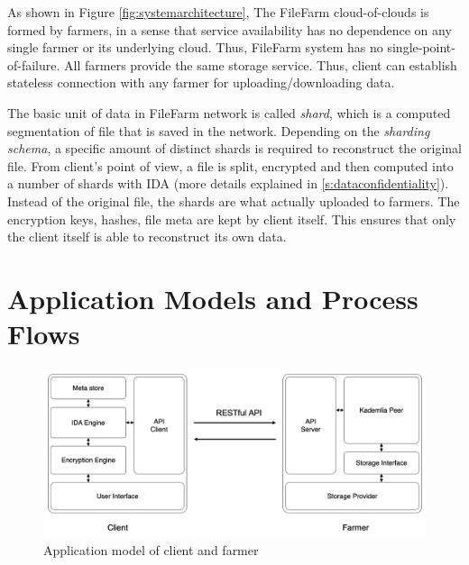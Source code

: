 As shown in Figure \ref{fig:systemarchitecture}, The FileFarm cloud-of-clouds is formed by farmers, in a sense that service availability has no dependence on any single farmer or its underlying cloud. Thus, FileFarm system has no single-point-of-failure. All farmers provide the same storage service. Thus, client can establish stateless connection with any farmer for uploading/downloading data.

The basic unit of data in FileFarm network is called \textit{shard}, which is a computed segmentation of file that is saved in the network. Depending on the \textit{sharding schema}, a specific amount of distinct shards is required to reconstruct the original file. From client's point of view, a file is split, encrypted and then computed into a number of shards with IDA (more details explained in \ref{s:dataconfidentiality}). Instead of the original file, the shards are what actually uploaded to farmers. The encryption keys, hashes, file meta are kept by client itself. This ensures that only the client itself is able to reconstruct its own data.

\section{Application Models and Process Flows}
\label{s:applicationmodelsandprocessflows}

\begin{figure}[hbt]
\centering
  \includegraphics[width=14cm]{figures/application_models.png}
  \caption{Application model of client and farmer}
  \label{fig:applicationmodels}
\end{figure}

